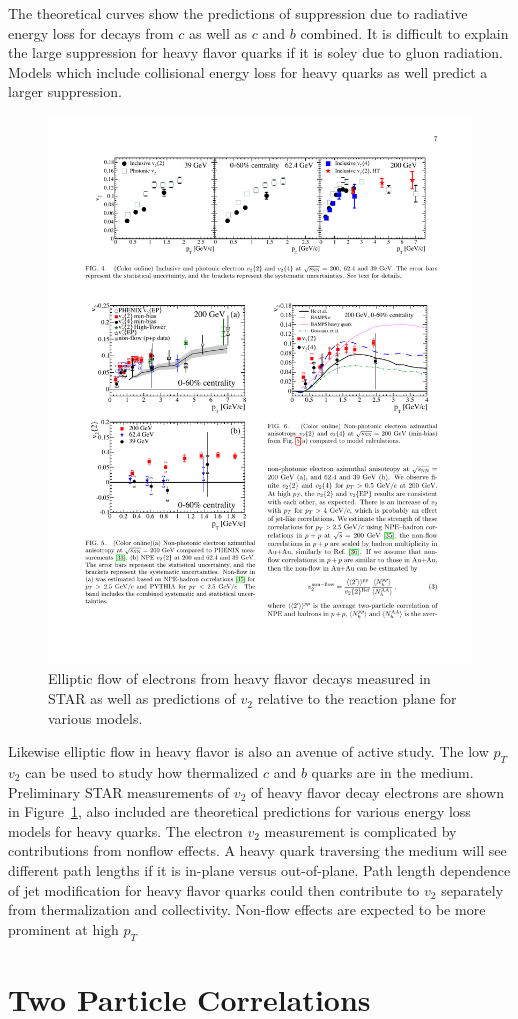 The theoretical curves show the predictions of suppression due to radiative energy loss for decays from $c$ as well as $c$ and $b$ combined. It is difficult to explain the large suppression for heavy flavor quarks if it is soley due to gluon radiation. Models which include collisional energy loss for heavy quarks as well predict a larger suppression.

\begin{figure}[htbp]
\begin{center}
\includegraphics[scale=1.5]{Plots/Intro/npe_v2.pdf}
\end{center}
\caption[NPE $v_2$]{Elliptic flow of electrons from heavy flavor decays measured in STAR as well as predictions of $v_2$ relative to the reaction plane for various models.}
\label{fig:npe_v2_intro}
\end{figure}

Likewise elliptic flow in heavy flavor is also an avenue of active study. The low $p_T$ $v_2$ can be used to study how thermalized $c$ and $b$ quarks are in the medium. Preliminary STAR measurements of $v_2$ of heavy flavor decay electrons are shown in Figure~\ref{fig:npe_v2_intro}, also included are theoretical predictions for various energy loss models for heavy quarks. The electron $v_2$ measurement is complicated by contributions from nonflow effects. A heavy quark traversing the medium will see different path lengths if it is in-plane versus out-of-plane. Path length dependence of jet modification for heavy flavor quarks could then contribute to $v_2$ separately from thermalization and collectivity. Non-flow effects are expected to be more prominent at high $p_T$

\section{Two Particle Correlations}
